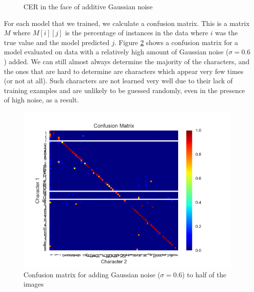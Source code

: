 \documentclass[10pt,twocolumn,letterpaper]{article}
\begin{document}
\begin{figure}
\caption{\label{fig:CER} CER in the face of additive Gaussian noise}
\end{figure}

For each model that we trained, we calculate a confusion matrix. 
This is a matrix $M$ where $M[i][j]$ is the percentage of instances
in the data where $i$ was the true value and the model predicted $j$.
Figure \ref{fig:confusion} shows a confusion matrix for a model evaluated
on data with a relatively high amount of Gaussian noise ($\sigma = 0.6$)
added. We can still almost always determine the majority of the characters,
and the ones that are hard to determine are characters which appear very
few times (or not at all). Such characters are not learned very well due to
their lack of training examples and are unlikely to be guessed randomly,
even in the presence of high noise, as a result.

\begin{figure}
\includegraphics[scale=.6]{confusion.png}
\caption{\label{fig:confusion} Confusion matrix for adding Gaussian noise ($\sigma = 0.6$) to half of the images}
\end{figure}
\end{document}
